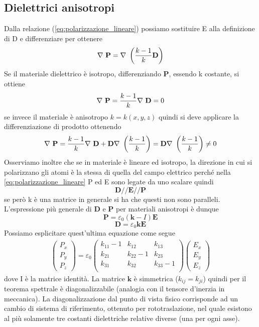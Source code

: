 \documentclass[
10pt, %
a4paper, %
oneside, %
headinclude,footinclude, %
BCOR5mm, %
]{scrartcl}
\begin{document}
\subsection{Dielettrici anisotropi}
Dalla relazione (\ref{eq:polarizzazione_lineare}) possiamo sostituire E alla definizione di D e differenziare per ottenere
\[\mathbf{\nabla\ }\mathbf{P} = \mathbf{\nabla\ }\left(\frac{k-1}{k}\mathbf{D}\right)\]
Se il materiale dielettrico è isotropo, differenziando $\mathbf{P}$, essendo k costante, si ottiene 
\[\mathbf{\nabla\ }\mathbf{P} = \frac{k-1}{k}\mathbf{\nabla\ }\mathbf{D} = 0\] 
se invece il materiale è anisotropo \(k=k(x,y,z)\) quindi si deve applicare la differenziazione di prodotto ottenendo
\[\mathbf{\nabla\ }\mathbf{P} = \frac{k-1}{k}\mathbf{\nabla\ }\mathbf{D} + \mathbf{D}\mathbf{\nabla\ }\left(\frac{k-1}{k}\right)= \mathbf{D}\mathbf{\nabla\ }\left(\frac{k-1}{k}\right)\neq 0\]
Osserviamo inoltre che se in materiale è lineare ed isotropo, la direzione in cui si polarizzano gli atomi è la stessa di quella del campo elettrico perché nella \ref{eq:polarizzazione_lineare} P ed E sono legate da uno scalare quindi
\[\mathbf{D}//\mathbf{E}//\mathbf{P}\]
se però k è una matrice in generale si ha che questi non sono paralleli. L'espressione più generale di $\mathbf{D}$ e $\mathbf{P}$ per materiali anisotropi è dunque
\[\mathbf{P} = \varepsilon_0 (\mathbf{k}-I)\mathbf{E}\]
\[\mathbf{D} = \varepsilon_0\mathbf{k}\mathbf{E}\]
Possiamo esplicitare quest'ultima equazione come segue
\begin{align*}
	\begin{pmatrix}
	P_x\\
	P_y\\
	P_z
	\end{pmatrix}
=\varepsilon_0
	\begin{pmatrix}
		k_{11}-1&k_{12}&k_{13}\\
		k_{21}&k_{22}-1&k_{23}\\
		k_{31}&k_{32}&k_{33}-1\\
	\end{pmatrix}
	\begin{pmatrix}
		E_x\\
		E_y\\
		E_z
	\end{pmatrix}
\end{align*}
dove I è la matrice identità. La matrice $\mathbf{k}$ è simmetrica (\(k_{ij} = k_{ji}\)) quindi per il teorema spettrale è diagonalizzabile (analogia con il tensore d'inerzia in meccanica). La diagonalizzazione dal punto di vista fisico corrisponde ad un cambio di sistema di riferimento, ottenuto per rototraslazione, nel quale esistono al più solamente tre costanti dielettriche relative diverse (una per ogni asse).
\end{document}
